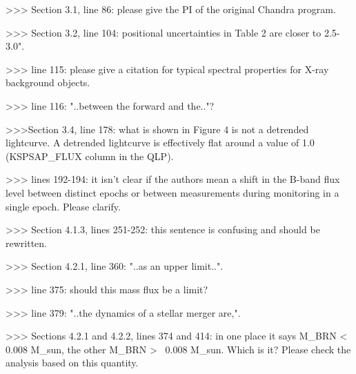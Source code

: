>>> Section 3.1, line 86: please give the PI of the original Chandra program.


>>> Section 3.2, line 104: positional uncertainties in Table 2 are closer to 2.5-3.0".

>>> line 115: please give a citation for typical spectral properties for X-ray background objects.

>>> line 116: "..between the forward and the.."?

>>>Section 3.4, line 178: what is shown in Figure 4 is not a detrended lightcurve. A detrended lightcurve is effectively flat around a value of 1.0 (KSPSAP_FLUX column in the QLP).

>>> lines 192-194: it isn't clear if the authors mean a shift in the B-band flux level between distinct epochs or between measurements during monitoring in a single epoch. Please clarify.

>>> Section 4.1.3, lines 251-252: this sentence is confusing and should be rewritten.

>>> Section 4.2.1, line 360: "..as an upper limit..".

>>> line 375: should this mass flux be a limit?

>>> line 379: "..the dynamics of a stellar merger are,".

>>> Sections 4.2.1 and 4.2.2, lines 374 and 414: in one place it says M_BRN < 0.008 M_sun, the other M_BRN >~ 0.008 M_sun. Which is it? Please check the analysis based on this quantity.

